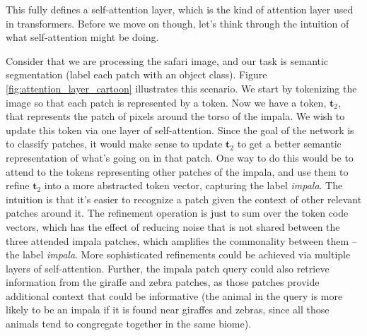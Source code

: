 This fully defines a self-attention layer, which is the kind of attention layer used in transformers. Before we move on though, let's think through the intuition of what self-attention might be doing.

Consider that we are processing the safari image, and our task is semantic segmentation (label each patch with an object class). Figure \ref{fig:attention_layer_cartoon} illustrates this scenario. We start by tokenizing the image so that each patch is represented by a token. Now we have a token, $\mathbf{t}_2$, that represents the patch of pixels around the torso of the impala. We wish to update this token via one layer of self-attention. Since the goal of the network is to classify patches, it would make sense to update $\mathbf{t}_2$ to get a better semantic representation of what's going on in that patch. One way to do this would be to attend to the tokens representing other patches of the impala, and use them to refine $\mathbf{t}_2$ into a more abstracted token vector, capturing the label \textit{impala}. The intuition is that it's easier to recognize a patch given the context of other relevant patches around it. The refinement operation is just to sum over the token code vectors, which has the effect of reducing noise that is not shared between the three attended impala patches, which amplifies the commonality between them -- the label \textit{impala}. More sophisticated refinements could be achieved via multiple layers of self-attention. Further, the impala patch query could also retrieve information from the giraffe and zebra patches, as those patches provide additional context that could be informative (the animal in the query is more likely to be an impala if it is found near giraffes and zebras, since all those animals tend to congregate together in the same biome).

